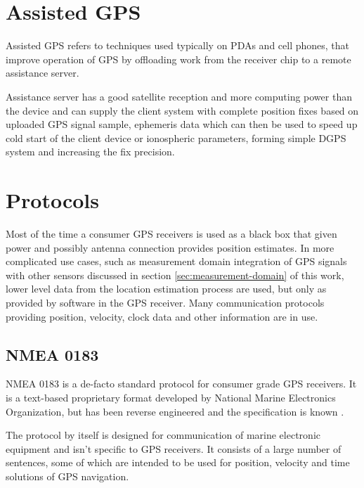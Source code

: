 \section{Assisted GPS}
Assisted GPS refers to techniques used typically on PDAs and cell phones, that improve operation of GPS by offloading
work from the receiver chip to a remote assistance server.

Assistance server has a good satellite reception and more computing power than the device
and can supply the client system with complete position fixes based on uploaded GPS signal sample,
ephemeris data which can then be used to speed up cold start of the client device or
ionospheric parameters, forming simple DGPS system and increasing the fix precision.



\section{Protocols}
Most of the time a consumer GPS receivers is used as a black box that given power and possibly antenna connection
provides position estimates.
In more complicated use cases, such as measurement domain integration of GPS signals with
other sensors discussed in section \ref{sec:measurement-domain} of this work,
lower level data from the location estimation process are used, but only as provided
by software in the GPS receiver.
Many communication protocols providing position, velocity, clock data
and other information are in use.

\subsection{NMEA 0183}
NMEA 0183 is a de-facto standard protocol for consumer grade GPS receivers.
It is a text-based proprietary format developed by National Marine Electronics Organization,
but has been reverse engineered and the specification is known \cite{depriest}.

The protocol by itself is designed for communication of marine electronic
equipment and isn't specific to GPS receivers.
It consists of a large number of sentences, some of which are intended to be used
for position, velocity and time solutions of GPS navigation.

